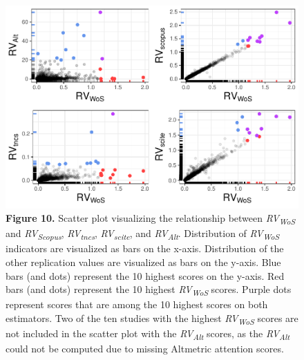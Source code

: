 \documentclass[
  man,floatsintext]{apa6}
\begin{document}
\begin{figure}
\centering
\includegraphics{RVcn_feasibility_in_social_neuroscience_cortex_files/figure-latex/fig10-1.pdf}
\caption{\label{fig:fig10}\textbf{Figure 10.} Scatter plot visualizing the relationship between \emph{RV\textsubscript{WoS}} and \emph{RV\textsubscript{Scopus}}, \emph{RV\textsubscript{tncs}}, \emph{RV\textsubscript{scite}}, and \emph{RV\textsubscript{Alt}}. Distribution of \emph{RV\textsubscript{WoS}} indicators are visualized as bars on the x-axis. Distribution of the other replication values are visualized as bars on the y-axis. Blue bars (and dots) represent the 10 highest scores on the y-axis. Red bars (and dots) represent the 10 highest \emph{RV\textsubscript{WoS}} scores. Purple dots represent scores that are among the 10 highest scores on both estimators. Two of the ten studies with the highest \emph{RV\textsubscript{WoS}} scores are not included in the scatter plot with the \emph{RV\textsubscript{Alt}} scores, as the \emph{RV\textsubscript{Alt}} could not be computed due to missing Altmetric attention scores.}
\end{figure}
\end{document}
